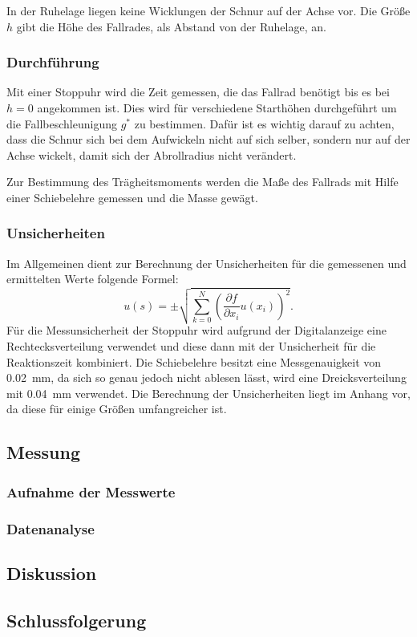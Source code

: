			In der Ruhelage liegen keine Wicklungen der Schnur auf der Achse vor. Die Größe $h$ gibt die Höhe des Fallrades, als Abstand von der Ruhelage, an. 
		
		\subsubsection{Durchführung}
			
			Mit einer Stoppuhr wird die Zeit gemessen, die das Fallrad benötigt bis es bei $h=0$ angekommen ist. Dies wird für verschiedene Starthöhen durchgeführt um die Fallbeschleunigung $g^{*}$ zu bestimmen. Dafür ist es wichtig darauf zu achten, dass die Schnur sich bei dem Aufwickeln nicht auf sich selber, sondern nur auf der Achse wickelt, damit sich der Abrollradius nicht verändert.
			
			Zur Bestimmung des Trägheitsmoments werden die Maße des Fallrads mit Hilfe einer Schiebelehre gemessen und die Masse gewägt.			
			
		\subsubsection{Unsicherheiten}
			
			Im Allgemeinen dient zur Berechnung der Unsicherheiten für die gemessenen und ermittelten Werte folgende Formel: 
			\begin{equation*}
				u(s) = \pm \sqrt{\sum_{k=0}^{N}\left( \frac{\partial f}{\partial x_i}u(x_i)\right) ^2}. \label{eq:kombUnsicherheit}
			\end{equation*}
			Für die Messunsicherheit der Stoppuhr wird aufgrund der Digitalanzeige eine Rechtecksverteilung verwendet und diese dann mit der Unsicherheit für die Reaktionszeit kombiniert. Die Schiebelehre besitzt eine Messgenauigkeit von \SI{0,02}{\mm}, da sich so genau jedoch nicht ablesen lässt, wird eine Dreicksverteilung mit  \SI{0,04}{\mm} verwendet.
			Die Berechnung der Unsicherheiten liegt im Anhang vor, da diese für einige Größen umfangreicher ist.
			
	\subsection{Messung}
	
		\subsubsection{Aufnahme der Messwerte}
	
		\subsubsection{Datenanalyse}	

	\subsection{Diskussion}
		
	\subsection{Schlussfolgerung}
	